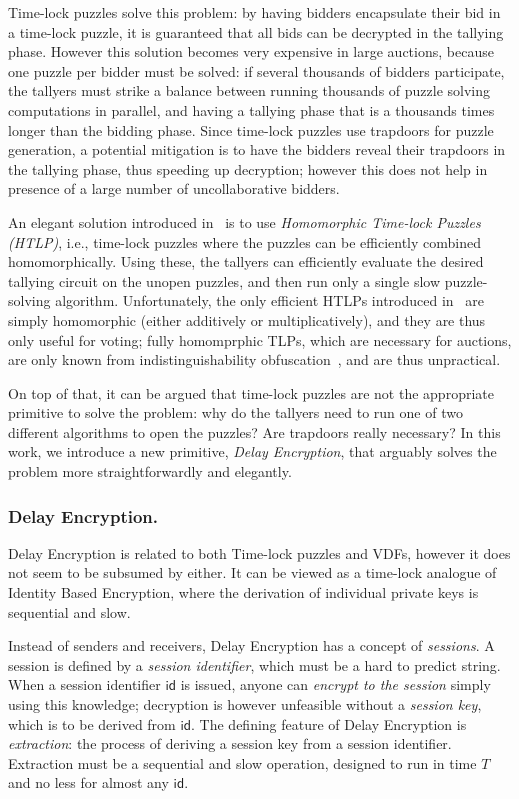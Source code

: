 \documentclass{llncs}
\newcommand{\id}{\mathsf{id}}
\begin{document}
Time-lock puzzles solve this problem: by having bidders encapsulate
their bid in a time-lock puzzle, it is guaranteed that all bids can be
decrypted in the tallying phase. %
However this solution becomes very expensive in large auctions,
because one puzzle per bidder must be solved: if several thousands of
bidders participate, the tallyers must strike a balance between
running thousands of puzzle solving computations in parallel, and
having a tallying phase that is a thousands times longer than the
bidding phase. %
Since time-lock puzzles use trapdoors for puzzle generation, a
potential mitigation is to have the bidders reveal their trapdoors in
the tallying phase, thus speeding up decryption; however this does not
help in presence of a large number of uncollaborative bidders.

An elegant solution introduced in~\cite{C:MalThy19} is to use
\emph{Homomorphic Time-lock Puzzles (HTLP)}, i.e., time-lock puzzles
where the puzzles can be efficiently combined homomorphically. %
Using these, the tallyers can efficiently evaluate the desired
tallying circuit on the unopen puzzles, and then run only a single
slow puzzle-solving algorithm. %
Unfortunately, the only efficient HTLPs introduced
in~\cite{C:MalThy19} are simply homomorphic (either additively or
multiplicatively), and they are thus only useful for voting; fully
homomprphic TLPs, which are necessary for auctions, are only known
from indistinguishability obfuscation~\cite{FOCS:GGHRSW13}, and are
thus unpractical. %

On top of that, it can be argued that time-lock puzzles are not the
appropriate primitive to solve the problem: why do the tallyers need
to run one of two different algorithms to open the puzzles? Are
trapdoors really necessary? %
In this work, we introduce a new primitive, \emph{Delay Encryption},
that arguably solves the problem more straightforwardly and elegantly.


\subsubsection{Delay Encryption.}
Delay Encryption is related to both Time-lock puzzles and VDFs,
however it does not seem to be subsumed by either. %
It can be viewed as a time-lock analogue of Identity Based Encryption,
where the derivation of individual private keys is sequential and
slow. %

Instead of senders and receivers, Delay Encryption has a concept of
\emph{sessions}. %
A session is defined by a \emph{session identifier}, which must be a
hard to predict string. %
When a session identifier $\id$ is issued, anyone can \emph{encrypt to
  the session} simply using this knowledge; decryption is however
unfeasible without a \emph{session key}, which is to be derived from
$\id$. %
The defining feature of Delay Encryption is \emph{extraction}: the
process of deriving a session key from a session identifier. %
Extraction must be a sequential and slow operation, designed to run in
time $T$ and no less for almost any $\id$.
\end{document}
